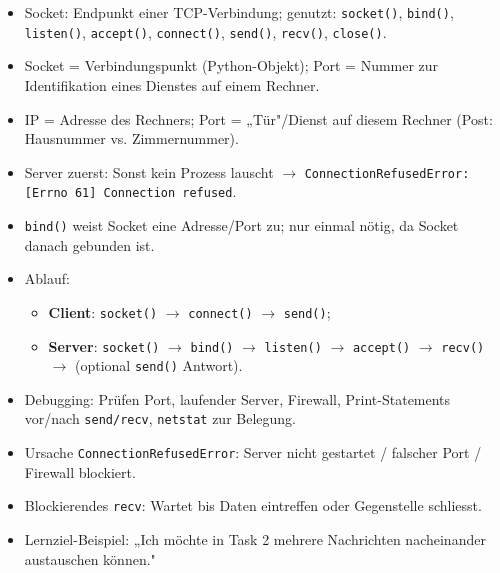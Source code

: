 \begin{myexercise}[Reflexionsfragen]
    \begin{myanswer}
        \begin{itemize}
            \item Socket: Endpunkt einer TCP-Verbindung; genutzt: \texttt{socket()}, \texttt{bind()}, \texttt{listen()}, \texttt{accept()}, \texttt{connect()}, \texttt{send()}, \texttt{recv()}, \texttt{close()}.
            \item Socket = Verbindungspunkt (Python-Objekt); Port = Nummer zur Identifikation eines Dienstes auf einem Rechner.
            \item \gls{IP} = Adresse des Rechners; Port = „Tür"/Dienst auf diesem Rechner (Post: Hausnummer vs. Zimmernummer).
            \item Server zuerst: Sonst kein Prozess lauscht $\rightarrow$ \texttt{ConnectionRefusedError: [Errno 61] Connection refused}.
            \item \texttt{bind()} weist Socket eine Adresse/Port zu; nur einmal nötig, da Socket danach gebunden ist.
            \item Ablauf:
                  \begin{itemize}
                      \item \textbf{Client}: \texttt{socket()} $\rightarrow$ \texttt{connect()} $\rightarrow$ \texttt{send()};
                      \item \textbf{Server}: \texttt{socket()} $\rightarrow$ \texttt{bind()} $\rightarrow$ \texttt{listen()} $\rightarrow$ \texttt{accept()} $\rightarrow$ \texttt{recv()} $\rightarrow$ (optional \texttt{send()} Antwort).
                  \end{itemize}

            \item Debugging: Prüfen Port, laufender Server, Firewall, Print-Statements vor/nach \texttt{send/recv}, \texttt{netstat} zur Belegung.
            \item Ursache \texttt{ConnectionRefusedError}: Server nicht gestartet / falscher Port / Firewall blockiert.
            \item Blockierendes \texttt{recv}: Wartet bis Daten eintreffen oder Gegenstelle schliesst.
            \item Lernziel-Beispiel: „Ich möchte in Task 2 mehrere Nachrichten nacheinander austauschen können."
        \end{itemize}
    \end{myanswer}
\end{myexercise}

